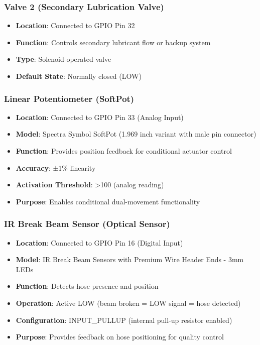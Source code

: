 \documentclass[11pt,a4paper]{article}
\begin{document}
\subsubsection{Valve 2 (Secondary Lubrication Valve)}
\begin{itemize}
    \item \textbf{Location}: Connected to GPIO Pin 32
    \item \textbf{Function}: Controls secondary lubricant flow or backup system
    \item \textbf{Type}: Solenoid-operated valve
    \item \textbf{Default State}: Normally closed (LOW)
\end{itemize}

\subsubsection{Linear Potentiometer (SoftPot)}
\begin{itemize}
    \item \textbf{Location}: Connected to GPIO Pin 33 (Analog Input)
    \item \textbf{Model}: Spectra Symbol SoftPot (1.969 inch variant with male pin connector)
    \item \textbf{Function}: Provides position feedback for conditional actuator control
    \item \textbf{Accuracy}: ±1\% linearity
    \item \textbf{Activation Threshold}: >100 (analog reading)
    \item \textbf{Purpose}: Enables conditional dual-movement functionality
\end{itemize}

\subsubsection{IR Break Beam Sensor (Optical Sensor)}
\begin{itemize}
    \item \textbf{Location}: Connected to GPIO Pin 16 (Digital Input)
    \item \textbf{Model}: IR Break Beam Sensors with Premium Wire Header Ends - 3mm LEDs
    \item \textbf{Function}: Detects hose presence and position
    \item \textbf{Operation}: Active LOW (beam broken = LOW signal = hose detected)
    \item \textbf{Configuration}: INPUT\_PULLUP (internal pull-up resistor enabled)
    \item \textbf{Purpose}: Provides feedback on hose positioning for quality control
\end{itemize}
\end{document}
